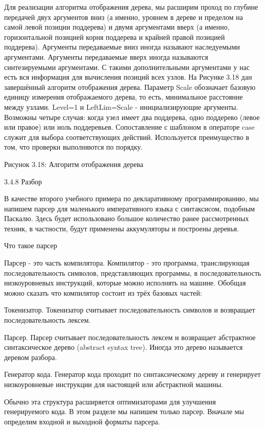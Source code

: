 Для реализации алгоритма отображения дерева, мы расширим проход по глубине передачей двух аргументов вниз (а именно, уровнем в дереве и пределом на самой левой позиции поддерева) и двумя аргументами вверх (а именно, горизонтальной позицией корня поддерева и крайней правой позицией поддерева). Аргументы передаваемые вниз иногда называют наследуемыми аргументами. Аргументы передаваемые вверх иногда называются синтезируемыми аргументами. С такими дополнительными аргументами у нас есть вся информация для вычисления позиций всех узлов. На Рисунке 3.18 дан завершённый алгоритм отображения дерева. Параметр Scale обозначает базовую единицу измерения отображаемого дерева, то есть, минимальное расстояние между узлами. Level=1 и LeftLim=Scale - инициализирующие аргументы. Возможны четыре случая: когда узел имеет два поддерева, одно поддерево (левое или правое) или ноль поддеревьев. Сопоставление с шаблоном в операторе case служит для выбора соответствующих действий. Используется преимущество в том, что проверки выполняются по порядку.

Рисунок 3.18: Алгоритм отображения дерева

3.4.8 Разбор

В качестве второго учебного примера по декларативному программированию, мы напишем парсер для маленького императивного языка с синтаксисом, подобным Паскалю. Здесь будет использовано большое количество ранее рассмотренных техник, в частности, будут применены аккумуляторы и построены деревья.

Что такое парсер

Парсер - это часть компилятора. Компилятор - это программа, транслирующая последовательность символов, представляющих программы, в последовательность низкоуровневых инструкций, которые можно исполнять на машине. Обобщая можно сказать что компилятор состоит из трёх базовых частей:

Токенизатор. Токенизатор считывает последовательность символов и возвращает последовательность лексем.

Парсер. Парсер считывает последовательность лексем и возвращает абстрактное синтаксическое дерево (abstract syntax tree). Иногда это дерево называется деревом разбора.

Генератор кода. Генератор кода проходит по синтаксическому дереву и генерирует низкоуровневые инструкции для настоящей или абстрактной машины.

Обычно эта структура расширяется оптимизаторами для улучшения генерируемого кода. В этом разделе мы напишем только парсер. Вначале мы определим входной и выходной форматы парсера.

